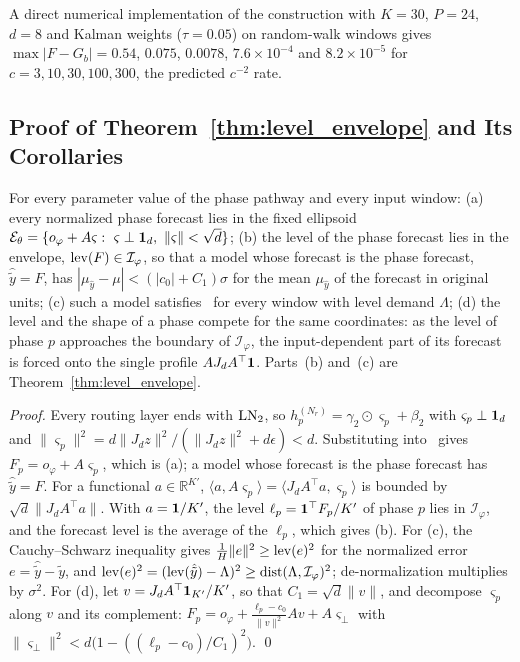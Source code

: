 {A direct numerical implementation of the construction with $K=30$, $P=24$, $d=8$ and Kalman weights ($\tau=0.05$) on random-walk windows gives $\max|F-G_b|=0.54$, $0.075$, $0.0078$, $7.6\times10^{-4}$ and $8.2\times10^{-5}$ for $c=3,10,30,100,300$, the predicted $c^{-2}$ rate.

\subsection{Proof of Theorem~\ref{thm:level_envelope} and Its Corollaries}

 For every parameter value of the phase pathway and every input window:
(a) every normalized phase forecast lies in the fixed ellipsoid $\mathcal E_\theta=\{o_\varphi+A\varsigma:\ \varsigma\perp\one_d,\ \|\varsigma\|<\sqrt d\}$;
(b) the level of the phase forecast lies in the envelope, $\operatorname{lev}(F)\in\mathcal I_\varphi$, so that a model whose forecast is the phase forecast, $\hat{\tilde y}=F$, has $|\mu_{\hat y}-\mu|<(|c_0|+C_1)\sigma$ for the mean $\mu_{\hat y}$ of the forecast in original units;
(c) such a model satisfies~ for every window with level demand $\Lambda$;
(d) the level and the shape of a phase compete for the same coordinates: as the level of phase $p$ approaches the boundary of $\mathcal I_\varphi$, the input-dependent part of its forecast is forced onto the single profile $AJ_dA^\top\mathbf 1$.
Parts~(b) and~(c) are Theorem~\ref{thm:level_envelope}.

\begin{proof}
Every routing layer ends with $\operatorname{LN}_2$, so $h^{(N_r)}_p=\gamma_2\odot\varsigma_p+\beta_2$ with $\varsigma_p\perp\mathbf 1_d$ and $\|\varsigma_p\|^2=d\|J_dz\|^2/(\|J_dz\|^2+d\epsilon)<d$. Substituting into~ gives $F_p=o_\varphi+A\varsigma_p$, which is (a); a model whose forecast is the phase forecast has $\hat{\tilde y}=F$. For a functional $a\in\mathbb R^{K'}$, $\langle a,A\varsigma_p\rangle=\langle J_dA^\top a,\varsigma_p\rangle$ is bounded by $\sqrt d\|J_dA^\top a\|$. With $a=\mathbf 1/K'$, the level $\ell_p=\mathbf 1^\top F_p/K'$ of phase $p$ lies in $\mathcal I_\varphi$, and the forecast level is the average of the $\ell_p$, which gives (b). For (c), the Cauchy--Schwarz inequality gives $\tfrac1H\|e\|^2\ge\operatorname{lev}(e)^2$ for the normalized error $e=\hat{\tilde y}-\tilde y$, and $\operatorname{lev}(e)^2=(\operatorname{lev}(\hat{\tilde y})-\Lambda)^2\ge\operatorname{dist}(\Lambda,\mathcal I_\varphi)^2$; de-normalization multiplies by $\sigma^2$. For (d), let $v=J_dA^\top\mathbf 1_{K'}/K'$, so that $C_1=\sqrt d\|v\|$, and decompose $\varsigma_p$ along $v$ and its complement: $F_p=o_\varphi+\tfrac{\ell_p-c_0}{\|v\|^2}Av+A\varsigma_\perp$ with $\|\varsigma_\perp\|^2<d\big(1-((\ell_p-c_0)/C_1)^2\big)$. \qed
\end{proof}

}
